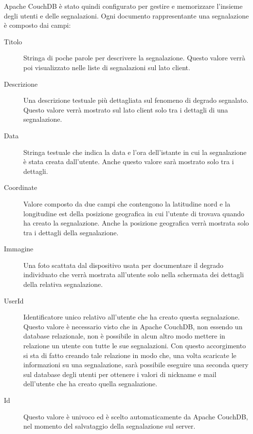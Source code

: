 		\noindent Apache CouchDB\texttrademark{} è stato quindi configurato per gestire e
		memorizzare l'insieme degli utenti e delle segnalazioni.
		Ogni documento rappresentante una segnalazione è composto dai campi:
		\begin{description}
			\item[Titolo] Stringa di poche parole per descrivere la segnalazione.
				Questo valore verrà poi visualizzato nelle liste di segnalazioni
				sul lato client.
			\item[Descrizione] Una descrizione testuale più dettagliata sul
				fenomeno di degrado segnalato. Questo valore verrà mostrato sul
				lato client solo tra i dettagli di una segnalazione.
			\item[Data] Stringa testuale che indica la data e l'ora dell'istante
				in cui la segnalazione è stata creata dall'utente. Anche questo
				valore sarà mostrato solo tra i dettagli.
			\item[Coordinate] Valore composto da due campi che contengono la
				latitudine nord e la longitudine est della posizione geografica
				in cui l'utente di trovava quando ha creato la segnalazione. Anche
				la posizione geografica verrà mostrata solo tra i dettagli della
				segnalazione.
			\item[Immagine] Una foto scattata dal dispositivo usata	per
				documentare il degrado individuato che verrà mostrata all'utente
				solo nella schermata dei dettagli della relativa segnalazione.
			\item[UserId] Identificatore unico relativo all'utente che ha creato
				questa segnalazione. Questo valore è necessario visto che in
				Apache CouchDB\texttrademark{}, non essendo un database relazionale,
				non è possibile in alcun altro modo mettere in relazione un utente con
				tutte le sue segnalazioni. Con questo accorgimento si sta di fatto
				creando tale relazione in modo che, una volta scaricate le
				informazioni su una segnalazione, sarà possibile eseguire una
				seconda query sul database degli utenti per ottenere i valori
				di nickname e mail dell'utente che ha creato quella segnalazione.
			\item[Id] Questo valore è univoco ed è scelto automaticamente da
				Apache CouchDB\texttrademark{}, nel momento del
				salvataggio della segnalazione sul server.
		\end{description}
		
